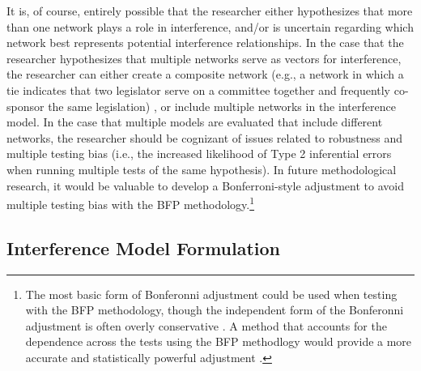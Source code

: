 \documentclass[12pt]{article}
\begin{document}
It is, of course, entirely possible that the researcher either hypothesizes that more than one network plays a role in interference, and/or is uncertain regarding which network best represents potential interference relationships. In the case that the researcher hypothesizes that multiple networks serve as vectors for interference,  the researcher can either create a composite network (e.g., a network in which a tie indicates that two legislator serve on a committee together and frequently co-sponsor the same legislation) \citep[e.g.,][]{ansari2011modeling}, or include multiple networks in the interference model.  In the case that multiple models are evaluated that include different networks, the researcher should be cognizant of issues related to robustness and multiple testing bias (i.e., the increased likelihood of Type 2 inferential errors when running multiple tests of the same hypothesis). In future methodological research, it would be valuable to develop a Bonferroni-style adjustment \citep{cabin2000bonferroni} to avoid multiple testing bias with the BFP methodology.\footnote{The most basic form of Bonferonni adjustment could be used when testing with the BFP methodology, though the independent form of the Bonferonni adjustment is often overly conservative \citep{simes1986improved}. A method that accounts for the dependence across the tests using the BFP methodlogy would provide a more accurate and statistically powerful adjustment \citep{stevens2017comparison}.} 

\subsection{Interference Model Formulation}
\end{document}
